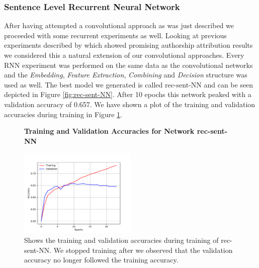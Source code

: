 \subsubsection{Sentence Level Recurrent Neural Network}
\label{subsubsec:rec_sent_nn}

After having attempted a convolutional approach as was just described we
proceeded with some recurrent experiments as well. Looking at previous
experiments described by \cite{qian:2018} which showed promising authorship
attribution results we considered this a natural extension of our convolutional
approaches. Every \gls{RNN} experiment was performed on the same data as the
convolutional networks and the \textit{Embedding}, \textit{Feature Extraction},
\textit{Combining} and \textit{Decision} structure was used as well. The
best model we generated is called \gls{rec-sent-NN} and can be seen depicted
in Figure \ref{fig:rec-sent-NN}. After 10 epochs this network peaked with
a validation accuracy of 0.657. We have shown a plot of the training and
validation accuracies during training in Figure \ref{fig:rec-sent-NN-training}.

\begin{figure}
    \centering
    \textbf{Training and Validation Accuracies for Network \gls{rec-sent-NN}}\par\medskip
    \includegraphics[width=0.5\textwidth]{./pictures/experiments/rec_sent_nn/training}
    \caption{Shows the training and validation accuracies during training of
        \gls{rec-sent-NN}. We stopped training after we observed that the
        validation accuracy no longer followed the training accuracy.}
    \label{fig:rec-sent-NN-training}
\end{figure}

